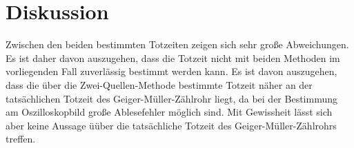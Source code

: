\section{Diskussion}
\label{sec:Diskussion}
Zwischen den beiden bestimmten Totzeiten zeigen sich sehr große Abweichungen.
Es ist daher davon auszugehen, dass die Totzeit nicht mit beiden Methoden im vorliegenden Fall zuverlässig bestimmt werden kann. Es ist davon auszugehen, dass die über die Zwei-Quellen-Methode bestimmte Totzeit näher an der tatsächlichen Totzeit des Geiger-Müller-Zählrohr liegt, da bei der Bestimmung am Oszilloskopbild große Ablesefehler möglich sind.
Mit Gewissheit lässt sich aber keine Aussage üüber die tatsächliche Totzeit des Geiger-Müller-Zählrohrs treffen.
